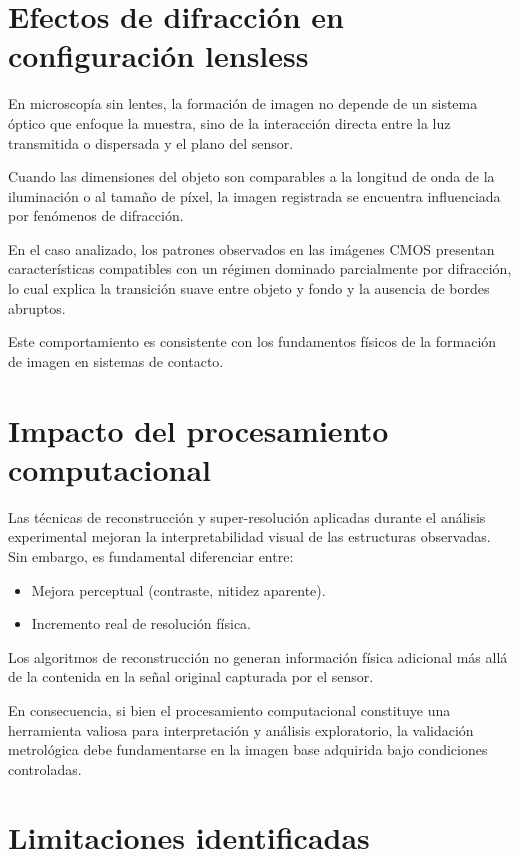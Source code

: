 \section{Efectos de difracción en configuración lensless}

En microscopía sin lentes, la formación de imagen no depende de un sistema óptico que enfoque la muestra, sino de la interacción directa entre la luz transmitida o dispersada y el plano del sensor.

Cuando las dimensiones del objeto son comparables a la longitud de onda de la iluminación o al tamaño de píxel, la imagen registrada se encuentra influenciada por fenómenos de difracción.

En el caso analizado, los patrones observados en las imágenes CMOS presentan características compatibles con un régimen dominado parcialmente por difracción, lo cual explica la transición suave entre objeto y fondo y la ausencia de bordes abruptos.

Este comportamiento es consistente con los fundamentos físicos de la formación de imagen en sistemas de contacto.
\section{Impacto del procesamiento computacional}

Las técnicas de reconstrucción y super-resolución aplicadas durante el análisis experimental mejoran la interpretabilidad visual de las estructuras observadas. Sin embargo, es fundamental diferenciar entre:

\begin{itemize}
    \item Mejora perceptual (contraste, nitidez aparente).
    \item Incremento real de resolución física.
\end{itemize}

Los algoritmos de reconstrucción no generan información física adicional más allá de la contenida en la señal original capturada por el sensor.

En consecuencia, si bien el procesamiento computacional constituye una herramienta valiosa para interpretación y análisis exploratorio, la validación metrológica debe fundamentarse en la imagen base adquirida bajo condiciones controladas.
\section{Limitaciones identificadas}


